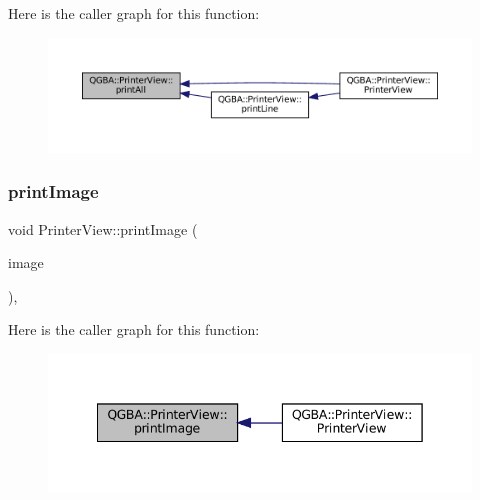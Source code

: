 Here is the caller graph for this function\+:
\nopagebreak
\begin{figure}[H]
\begin{center}
\leavevmode
\includegraphics[width=350pt]{class_q_g_b_a_1_1_printer_view_a194a0d28136e593ada362ba98a2a69a8_icgraph}
\end{center}
\end{figure}
\mbox{\label{class_q_g_b_a_1_1_printer_view_aafb4738a822d711c75f42dc3142e1152}} 
\subsubsection{\texorpdfstring{print\+Image}{printImage}}
{\footnotesize\ttfamily void Printer\+View\+::print\+Image (\begin{DoxyParamCaption}\item[{const Q\+Image \&}]{image }\end{DoxyParamCaption})\hspace{0.3cm}{\ttfamily [private]}, {\ttfamily [slot]}}

Here is the caller graph for this function\+:
\nopagebreak
\begin{figure}[H]
\begin{center}
\leavevmode
\includegraphics[width=342pt]{class_q_g_b_a_1_1_printer_view_aafb4738a822d711c75f42dc3142e1152_icgraph}
\end{center}
\end{figure}
\mbox{\label{class_q_g_b_a_1_1_printer_view_a30a8310a3788be585bc9d0dc20a2ea09}} 
